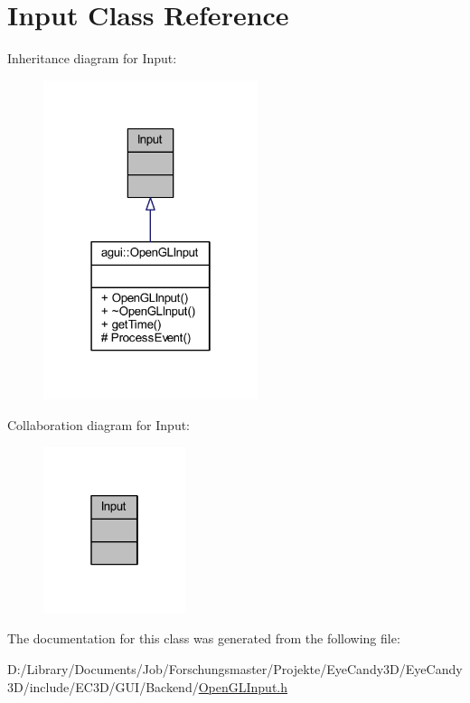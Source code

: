 \hypertarget{class_input}{}\section{Input Class Reference}
\label{class_input}


Inheritance diagram for Input\+:
\nopagebreak
\begin{figure}[H]
\begin{center}
\leavevmode
\includegraphics[width=178pt]{class_input__inherit__graph}
\end{center}
\end{figure}


Collaboration diagram for Input\+:
\nopagebreak
\begin{figure}[H]
\begin{center}
\leavevmode
\includegraphics[width=118pt]{class_input__coll__graph}
\end{center}
\end{figure}


The documentation for this class was generated from the following file\+:\begin{DoxyCompactItemize}
\item 
D\+:/\+Library/\+Documents/\+Job/\+Forschungsmaster/\+Projekte/\+Eye\+Candy3\+D/\+Eye\+Candy3\+D/include/\+E\+C3\+D/\+G\+U\+I/\+Backend/\mbox{\hyperlink{_open_g_l_input_8h}{Open\+G\+L\+Input.\+h}}\end{DoxyCompactItemize}
